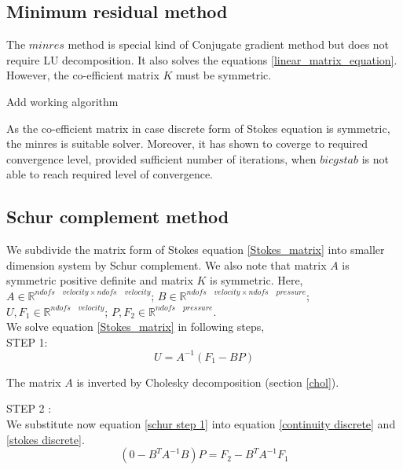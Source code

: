 \documentclass[a4paper,12pt]{book}
\begin{document}
\subsection{Minimum residual method} 

The $minres$ method is special kind of Conjugate gradient method but does not require LU decomposition. It also solves the equations \ref{linear_matrix_equation}. However, the co-efficient matrix $K$ must be symmetric. 

\begin{Huge}
Add working algorithm
\end{Huge}

As the co-efficient matrix in case discrete form of Stokes equation is symmetric, the minres is suitable solver. Moreover, it has shown to coverge to required convergence level, provided sufficient number of iterations, when $bicgstab$ is not able to reach required level of convergence.

\subsection{Schur complement method} \cite{Fritzen} \label{schur}

We subdivide the matrix form of Stokes equation \eqref{Stokes_matrix} into smaller dimension system by Schur complement. We also note that matrix $A$ is symmetric positive definite and matrix $K$ is symmetric.
Here, $A \in \mathbb{R}^{ndofs\quad velocity \times ndofs \quad velocity}$; $B \in \mathbb{R}^{ndofs \quad velocity \times ndofs \quad pressure}$; $U,F_1 \in \mathbb{R}^{ndofs \quad velocity}$; $P, F_2 \in \mathbb{R}^{ndofs \quad pressure}$. \\

We solve equation \eqref{Stokes_matrix} in following steps,\\

STEP 1: \\ 
\begin{equation}\label{schur step 1}
U = A^{-1}(F_1 - BP) 
\end{equation}

The matrix $A$ is inverted by Cholesky decomposition (section \ref{chol}). 

STEP 2 : \\
We substitute now equation \eqref{schur step 1} into equation \eqref{continuity discrete} and \eqref{stokes discrete}.
\begin{equation}\label{schur step 2}
(0 - B^T A^{-1} B) P = F_2 - B^T A^{-1} F_1
\end{equation}
\end{document}
